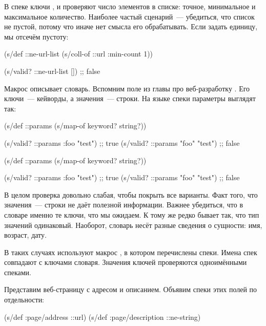 В спеке  ключи ,  и
 проверяют число элементов в списке: точное, минимальное и
максимальное количество. Наиболее частый сценарий~--- убедиться, что список не
пустой, потому что иначе нет смысла его обрабатывать. Если задать
 единицу, мы отсечём пустоту:

\begin{clojure}
(s/def ::ne-url-list
  (s/coll-of ::url :min-count 1))

(s/valid? ::ne-url-list [])
;; false
\end{clojure}


Макрос  описывает словарь. Вспомним поле  из
главы про веб-разработку . Его ключи~--- кейворды, а значения~---
строки. На языке спеки параметры выглядят так:

\ifnarrow

\begin{clojure}
(s/def ::params
  (s/map-of keyword? string?))

(s/valid? ::params
  {:foo "test"})  ;; true
(s/valid? ::params
  {"foo" "test"}) ;; false
\end{clojure}

\else

\begin{clojure}
(s/def ::params
  (s/map-of keyword? string?))

(s/valid? ::params {:foo "test"})  ;; true
(s/valid? ::params {"foo" "test"}) ;; false
\end{clojure}

\fi

В целом проверка  довольно слабая, чтобы покрыть все
варианты. Факт того, что значения~--- строки не даёт полезной информации. Важнее
убедиться, что в словаре именно те ключи, что мы ожидаем. К тому же редко бывает
так, что тип значений одинаковый. Наоборот, словарь несёт разные сведения о
сущности: имя, возраст, дату.


В таких случаях используют макрос , в котором перечислены
спеки. Имена спек совпадают с ключами словаря. Значения ключей проверяются
одноимёнными спеками.

Представим веб-страницу с адресом и описанием. Объявим спеки этих полей по
отдельности:

\begin{clojure}
(s/def :page/address ::url)
(s/def :page/description ::ne-string)
\end{clojure}

